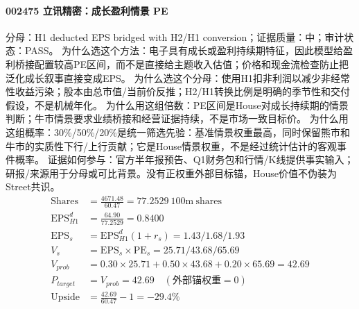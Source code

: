 \paragraph{002475 立讯精密：成长盈利情景 PE}
分母：H1 deducted EPS bridged with H2/H1 conversion；证据质量：中；审计状态：PASS。
为什么选这个方法：电子具有成长或盈利持续期特征，因此模型给盈利桥接配置较高PE区间，而不是直接给主题收入估值；价格和现金流检查防止把泛化成长叙事直接变成EPS。
为什么选这个分母：使用H1扣非利润以减少非经常性收益污染；股本由总市值/当前价反推；H2/H1转换比例是明确的季节性和交付假设，不是机械年化。
为什么用这组倍数：PE区间是House对成长持续期的情景判断；牛市情景要求业绩桥接和经营证据持续，不是市场一致目标价。
为什么用这组概率：30\%/50\%/20\%是统一筛选先验：基准情景权重最高，同时保留熊市和牛市的实质性下行/上行贡献；它是House情景权重，不是经过统计估计的客观事件概率。
证据如何参与：官方半年报预告、Q1财务包和行情/K线提供事实输入；研报/来源用于分母或可比背景。没有正权重外部目标锚，House价值不伪装为Street共识。
\begin{align*}
\mathrm{Shares} &= \frac{4671.48}{60.47}=77.2529\ \mathrm{100m\ shares}\\
\mathrm{EPS}_{H1}^d &= \frac{64.90}{77.2529}=0.8400\\
\mathrm{EPS}_s &= \mathrm{EPS}_{H1}^d(1+r_s)=1.43/1.68/1.93\\
V_s &= \mathrm{EPS}_s\times \mathrm{PE}_s=25.71/43.68/65.69\\
V_{prob} &= 0.30\times 25.71+0.50\times 43.68+0.20\times 65.69=42.69\\
P_{target} &= V_{prob}=42.69\quad(\text{外部锚权重}=0)\\
\mathrm{Upside} &= \frac{42.69}{60.47}-1=-29.4\%\\
\end{align*}

